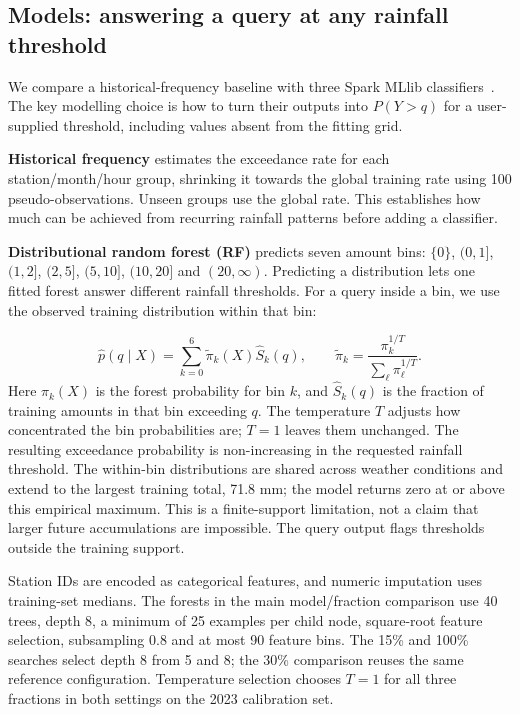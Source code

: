 \subsection{Models: answering a query at any rainfall threshold}
We compare a historical-frequency baseline with three Spark MLlib classifiers~\cite{sparkml}. The key modelling choice is how to turn their outputs into $P(Y>q)$ for a user-supplied threshold, including values absent from the fitting grid.

\textbf{Historical frequency} estimates the exceedance rate for each station/month/hour group, shrinking it towards the global training rate using 100 pseudo-observations. Unseen groups use the global rate. This establishes how much can be achieved from recurring rainfall patterns before adding a classifier.

\textbf{Distributional random forest (RF)} predicts seven amount bins: $\{0\}$, $(0,1]$, $(1,2]$, $(2,5]$, $(5,10]$, $(10,20]$ and $(20,\infty)$. Predicting a distribution lets one fitted forest answer different rainfall thresholds. For a query inside a bin, we use the observed training distribution within that bin:

\[
\widehat p(q\mid X)=\sum_{k=0}^{6}\widetilde\pi_k(X)\widehat S_k(q),
\qquad
\widetilde\pi_k=\frac{\pi_k^{1/T}}{\sum_\ell\pi_\ell^{1/T}}.
\]
Here $\pi_k(X)$ is the forest probability for bin $k$, and $\widehat S_k(q)$ is the fraction of training amounts in that bin exceeding $q$. The temperature $T$ adjusts how concentrated the bin probabilities are; $T=1$ leaves them unchanged. The resulting exceedance probability is non-increasing in the requested rainfall threshold. The within-bin distributions are shared across weather conditions and extend to the largest training total, 71.8 mm; the model returns zero at or above this empirical maximum. This is a finite-support limitation, not a claim that larger future accumulations are impossible. The query output flags thresholds outside the training support.

Station IDs are encoded as categorical features, and numeric imputation uses training-set medians. The forests in the main model/fraction comparison use 40 trees, depth 8, a minimum of 25 examples per child node, square-root feature selection, subsampling 0.8 and at most 90 feature bins. The 15\% and 100\% searches select depth 8 from 5 and 8; the 30\% comparison reuses the same reference configuration. Temperature selection chooses $T=1$ for all three fractions in both settings on the 2023 calibration set.

